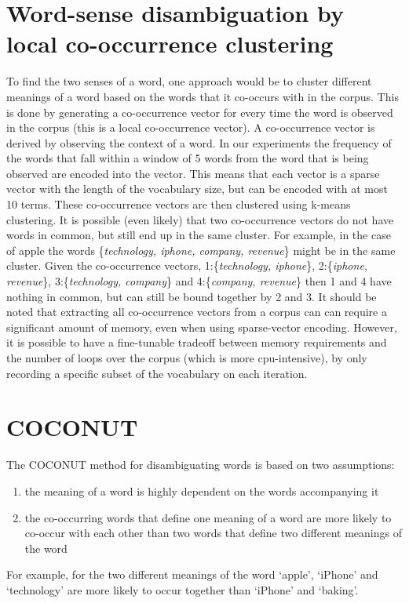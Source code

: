\documentclass[11pt]{article}
\begin{document}
\section{Word-sense disambiguation by local co-occurrence clustering}
\label{remi}
To find the two senses of a word, one approach would be to cluster different meanings of a word based on the words that it co-occurs with in the corpus. This is done by generating a co-occurrence vector for every time the word is observed in the corpus (this is a local co-occurrence vector). A co-occurrence vector is derived by observing the context of a word. In our experiments the frequency of the words that fall within a window of 5 words from the word that is being observed are encoded into the vector. This means that each vector is a sparse vector with the length of the vocabulary size, but can be encoded with at most 10 terms. These co-occurrence vectors are then clustered using k-means clustering. It is possible (even likely) that two co-occurrence vectors do not have words in common, but still end up in the same cluster. For example, in the case of apple the words \{\textit{technology, iphone, company, revenue}\} might be in the same cluster. Given the co-occurrence vectors, 1:\{\textit{technology, iphone}\}, 2:\{\textit{iphone, revenue}\}, 3:\{\textit{technology, company}\} and 4:\{\textit{company, revenue}\} then 1 and 4 have nothing in common, but can still be bound together by 2 and 3. It should be noted that extracting all co-occurrence vectors from a corpus can can require a significant amount of memory, even when using sparse-vector encoding. However, it is possible to have a fine-tunable tradeoff between memory requirements and the number of loops over the corpus (which is more cpu-intensive), by only recording a specific subset of the vocabulary on each iteration.

\section{COCONUT}
\label{anouk}
The COCONUT method for disambiguating words is based on two assumptions: 
\begin{enumerate}
\item the meaning of a word is highly dependent on the words accompanying it
\item the co-occurring words that define one meaning of a word are more likely to co-occur with each other than two words that define two different meanings of the word
\end{enumerate}
For example, for the two different meanings of the word `apple', `iPhone' and `technology' are more likely to occur together than `iPhone' and `baking'. 
\end{document}
